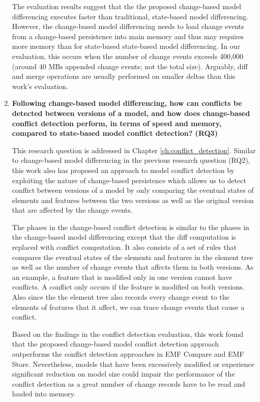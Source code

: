 \begin{enumerate}
 The evaluation results suggest that the the proposed change-based model differencing executes faster than traditional, state-based model differencing.
 However, the change-based model differencing needs to load change events from a change-based persistence into main memory and thus may requires more memory than for state-based state-based model differencing. In our evaluation, this occurs when the number of change events exceeds 400,000 (around 40 MBs appended change events; not the total size). Arguably, diff and merge operations are usually performed on smaller deltas than this work's evaluation.
  
  \item \textbf{Following change-based model differencing, how can conflicts be detected between versions of a model, and  how does change-based conflict detection perform, in terms of speed and memory, compared to state-based model conflict detection? (RQ3)} 
  
  This research question is addressed in Chapter \ref{ch:conflict_detection}.  Similar to change-based model differencing in the previous research question (RQ2), this work also has proposed an approach to model conflict detection by exploiting the nature of change-based persistence which allows us to detect conflict between versions of a model by only comparing the eventual states of elements and features between the two versions as well as the original version that are affected by the change events.
  
  The phases in the change-based conflict detection is similar to the phases in the change-based model differencing except that the diff computation is replaced with conflict computation. It also consists of a set of rules that compares the eventual states of the elements and features in the element tree as well as the number of change events that affects them in both versions. As an example, a feature that is modified only in one version cannot have conflicts. A conflict only occurs if the feature is modified on both versions. Also since the the element tree also records every change event to the elements of features that it affect, we can trace change events that cause a conflict.
  
Based on the findings in the conflict detection evaluation, this work found that the proposed change-based model conflict detection approach outperforms the conflict detection approaches in EMF Compare and EMF Store. Nevertheless, models that have been excessively modified or experience significant reduction on model size could impair the performance of the conflict detection as a great number of change records have to be read and loaded into memory.
  
\end{enumerate}

